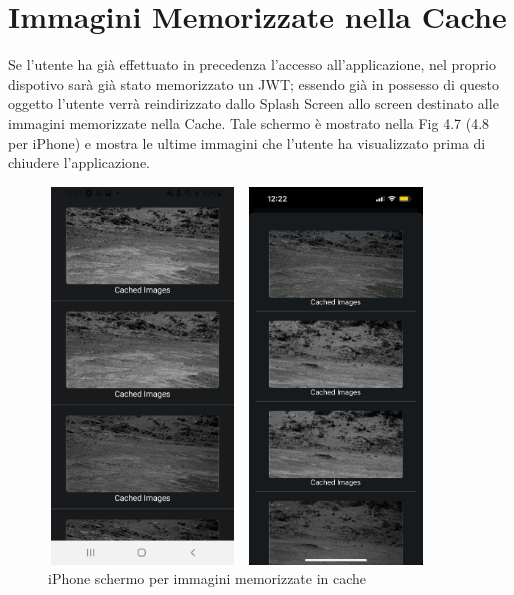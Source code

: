 \section*{Immagini Memorizzate nella Cache}
Se l'utente ha gi\`a effettuato in precedenza l'accesso all'applicazione, nel proprio dispotivo sar\`a gi\`a stato memorizzato un JWT;
essendo gi\`a in possesso di questo oggetto l'utente verr\`a reindirizzato dallo Splash Screen allo screen destinato alle immagini memorizzate nella Cache. Tale schermo \`e mostrato
nella Fig 4.7 (4.8 per iPhone) e mostra le ultime immagini che l'utente ha visualizzato prima di chiudere l'applicazione.
\begin{figure}[h]
    \begin{minipage}[h]{0.47\textwidth}
        \centering
        \includegraphics[width=5cm, height=10cm]{images/immaginiAndroid/imagesLoadin.jpg}
        \caption{\label{imagesLoadinAndroid} Android schermo per immagini memorizzate in cache}
    \end{minipage}
    \hfill
    \begin{minipage}[h]{0.47\textwidth}
        \centering
        \includegraphics[width=5cm, height=10cm]{images/immaginiPhone/imagesLoading.jpeg}
        \caption{\label{imagesLoadinIphone}iPhone schermo per immagini memorizzate in cache}
    \end{minipage}
\end{figure}

